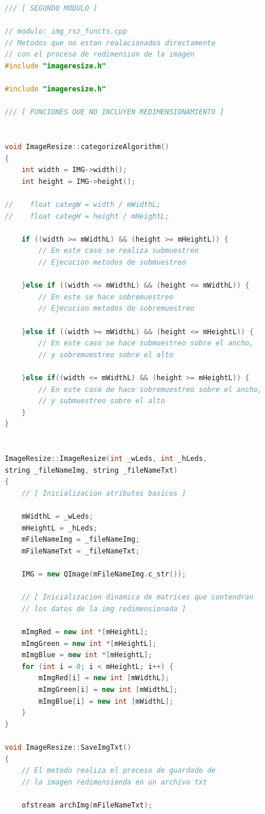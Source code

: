 \documentclass{article}
\begin{document}
\begin{lstlisting}[language=C++, label=codigo_matrices_int]
/// [ SEGUNDO MODULO ]

// modulo: img_rsz_functs.cpp
// Metodos que no estan realacionados directamente  
// con el proceso de redimension de la imagen
#include "imageresize.h"

#include "imageresize.h"

/// [ FUNCIONES QUE NO INCLUYEN REDIMENSIONAMIENTO ]


void ImageResize::categorizeAlgorithm()
{
    int width = IMG->width();
    int height = IMG->height();

//    float categW = width / mWidthL;
//    float categH = height / mHeightL;

    if ((width >= mWidthL) && (height >= mHeightL)) {
        // En este caso se realiza submuestreo
        // Ejecucion metodos de submuestreo
        
    }else if ((width <= mWidthL) && (height <= mWidthL)) {
        // En este se hace sobremuestreo
        // Ejecucion metodos de sobremuestreo
        
    }else if ((width >= mWidthL) && (height <= mHeightL)) {
        // En este caso se hace submuestreo sobre el ancho,
        // y sobremuestreo sobre el alto
        
    }else if((width <= mWidthL) && (height >= mHeightL)) {
        // En este caso de hace sobremuestreo sobre el ancho,
        // y submuestreo sobre el alto
    }
}


ImageResize::ImageResize(int _wLeds, int _hLeds, 
string _fileNameImg, string _fileNameTxt)
{
    // [ Inicializacion atributos basicos ]

    mWidthL = _wLeds;
    mHeightL = _hLeds;
    mFileNameImg = _fileNameImg;
    mFileNameTxt = _fileNameTxt;

    IMG = new QImage(mFileNameImg.c_str());

    // [ Inicializacion dinamica de matrices que contendran 
    // los datos de la img redimensionada ]

    mImgRed = new int *[mHeightL];
    mImgGreen = new int *[mHeightL];
    mImgBlue = new int *[mHeightL];
    for (int i = 0; i < mHeightL; i++) {
        mImgRed[i] = new int [mWidthL];
        mImgGreen[i] = new int [mWidthL];
        mImgBlue[i] = new int [mWidthL];
    }
}

void ImageResize::SaveImgTxt()
{
    // El metodo realiza el proceso de guardado de 
    // la imagen redimensionda en un archivo txt

    ofstream archImg(mFileNameTxt);


\end{lstlisting}
\end{document}
